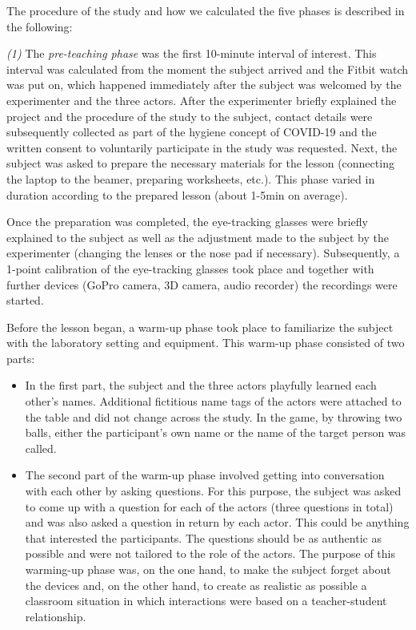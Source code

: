 \documentclass[
  man,floatsintext]{apa6}
\providecommand{\tightlist}{%
  \setlength{\itemsep}{0pt}\setlength{\parskip}{0pt}}
\begin{document}
The procedure of the study and how we calculated the five phases is described in the following:

\emph{(1)} The \emph{pre-teaching phase} was the first 10-minute interval of interest. This interval was calculated from the moment the subject arrived and the Fitbit watch was put on, which happened immediately after the subject was welcomed by the experimenter and the three actors. After the experimenter briefly explained the project and the procedure of the study to the subject, contact details were subsequently collected as part of the hygiene concept of COVID-19 and the written consent to voluntarily participate in the study was requested. Next, the subject was asked to prepare the necessary materials for the lesson (connecting the laptop to the beamer, preparing worksheets, etc.). This phase varied in duration according to the prepared lesson (about 1-5min on average).

Once the preparation was completed, the eye-tracking glasses were briefly explained to the subject as well as the adjustment made to the subject by the experimenter (changing the lenses or the nose pad if necessary). Subsequently, a 1-point calibration of the eye-tracking glasses took place and together with further devices (GoPro camera, 3D camera, audio recorder) the recordings were started.

Before the lesson began, a warm-up phase took place to familiarize the subject with the laboratory setting and equipment. This warm-up phase consisted of two parts:

\begin{itemize}
\tightlist
\item
  In the first part, the subject and the three actors playfully learned each other's names. Additional fictitious name tags of the actors were attached to the table and did not change across the study. In the game, by throwing two balls, either the participant's own name or the name of the target person was called.
\item
  The second part of the warm-up phase involved getting into conversation with each other by asking questions. For this purpose, the subject was asked to come up with a question for each of the actors (three questions in total) and was also asked a question in return by each actor. This could be anything that interested the participants. The questions should be as authentic as possible and were not tailored to the role of the actors.
  The purpose of this warming-up phase was, on the one hand, to make the subject forget about the devices and, on the other hand, to create as realistic as possible a classroom situation in which interactions were based on a teacher-student relationship.
\end{itemize}
\end{document}

